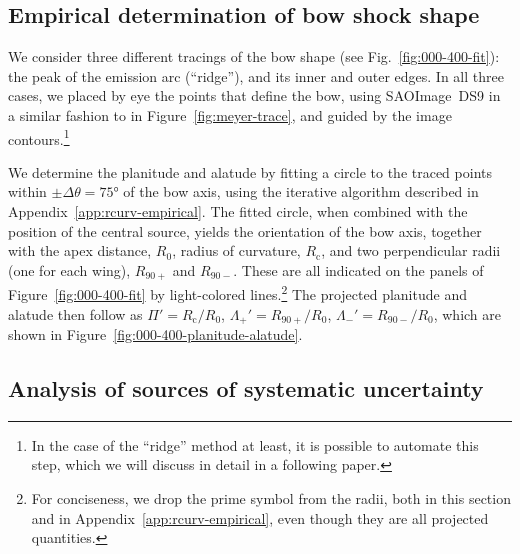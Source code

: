 \documentclass[useAMS, usenatbib, a4paper]{mnras}
\newcommand\C{\ensuremath{\mathrm{c}}}
\begin{document}
\subsection{Empirical determination of bow shock shape}
\label{sec:empir-determ-bow}

We consider three different tracings of the bow shape (see
Fig.~\ref{fig:000-400-fit}): the peak of the emission arc (``ridge''),
and its inner and outer edges.  In all three cases, we placed by eye
the points that define the bow, using SAOImage~DS9 \citep{Joye:2003a}
in a similar fashion to in Figure~\ref{fig:meyer-trace}, and guided by
the image contours.\footnote{%
  In the case of the ``ridge'' method at least, it is possible to
  automate this step, which we will discuss in detail in a following
  paper. } %

We determine the planitude and alatude by fitting a circle to the
traced points within \(\pm \Delta\theta = \ang{75}\) of the bow axis, using the
iterative algorithm described in Appendix~\ref{app:rcurv-empirical}.
The fitted circle, when combined with the position of the central
source, yields the orientation of the bow axis, together with the apex
distance, \(R_0\), radius of curvature, \(R_\C\), and two
perpendicular radii (one for each wing), \(R_{90+}\) and \(R_{90-}\).
These are all indicated on the panels of Figure~\ref{fig:000-400-fit}
by light-colored lines.\footnote{%
  For conciseness, we drop the prime symbol from the radii, both in
  this section and in Appendix~\ref{app:rcurv-empirical}, even though
  they are all projected quantities.} %
The projected planitude and alatude then follow as
\(\Pi' = R_\C/R_0\), \(\Lambda_+' = R_{90+}/R_0\),
\(\Lambda_-' = R_{90-}/R_0\), which are shown in
Figure~\ref{fig:000-400-planitude-alatude}.

\subsection{Analysis of sources of systematic uncertainty}
\label{sec:analys-sourc-syst}
\end{document}
